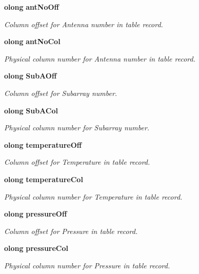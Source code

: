 \begin{CompactItemize}
{\bf olong} {\bf ant\-No\-Off}
\begin{CompactList}\small\item\em Column offset for Antenna number in table record. \item\end{CompactList}\item 
{\bf olong} {\bf ant\-No\-Col}
\begin{CompactList}\small\item\em Physical column number for Antenna number in table record. \item\end{CompactList}\item 
{\bf olong} {\bf Sub\-AOff}
\begin{CompactList}\small\item\em Column offset for Subarray number. \item\end{CompactList}\item 
{\bf olong} {\bf Sub\-ACol}
\begin{CompactList}\small\item\em Physical column number for Subarray number. \item\end{CompactList}\item 
{\bf olong} {\bf temperature\-Off}
\begin{CompactList}\small\item\em Column offset for Temperature in table record. \item\end{CompactList}\item 
{\bf olong} {\bf temperature\-Col}
\begin{CompactList}\small\item\em Physical column number for Temperature in table record. \item\end{CompactList}\item 
{\bf olong} {\bf pressure\-Off}
\begin{CompactList}\small\item\em Column offset for Pressure in table record. \item\end{CompactList}\item 
{\bf olong} {\bf pressure\-Col}
\begin{CompactList}\small\item\em Physical column number for Pressure in table record. \item\end{CompactList}\item 

\end{CompactItemize}

